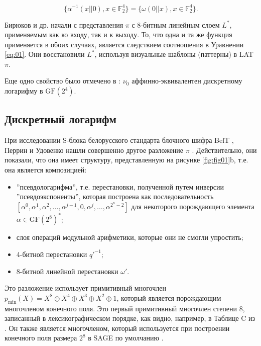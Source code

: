 \begin{equation}
\{\alpha^{-1}(x||0), x \in \mathbb{F}_2^4\} = \{\omega(0||x), x \in \mathbb{F}_2^4\}.
\label{eq:01}
\end{equation}

Бирюков и др. начали с представления \(\pi\) с 8-битным линейным слоем \(L^*\), применяемым как ко входу, так и к выходу. То, что одна и та же функция применяется в обоих случаях, является следствием соотношения в Уравнении \ref{eq:01}. Они восстановили \(L^*\), используя визуальные шаблоны (паттерны) в LAT \(\pi\).

Еще одно свойство было отмечено в \cite{PU16}: \(\nu_0\) аффинно-эквивалентен дискретному логарифму в \(\text{GF}(2^4)\).

\subsection{Дискретный логарифм}

При исследовании S-блока белорусского стандарта блочного шифра BelT \cite{Bel11}, Перрин и Удовенко нашли совершенно другое разложение \(\pi\) \cite{PU16}. Действительно, они показали, что она имеет структуру, представленную на рисунке \ref{fig:fig01}b, т.е. она является композицией:

\begin{itemize}
    \item ''псевдологарифма'', т.е. перестановки, полученной путем инверсии ''псевдоэкспоненты'', которая построена как последовательность \([\alpha^0, \alpha^1, \alpha^2, \ldots, \alpha^{j-1}, 0, \alpha^j, \ldots, \alpha^{2^n-2}]\) для некоторого порождающего элемента \(\alpha \in \text{GF}(2^8)^*\);
    \item слоя операций модульной арифметики, которые они не смогли упростить;
    \item 4-битной перестановки \(q'^{-1}\);
    \item 8-битной линейной перестановки \(\omega'\).
\end{itemize}

Это разложение использует примитивный многочлен \(p_{\text{min}}(X) = X^8 \oplus X^4 \oplus X^3 \oplus X^2 \oplus 1\), который является порождающим многочленом конечного поля. Это первый примитивный многочлен степени 8, записанный в лексикографическом порядке, как видно, например, в Таблице C из \cite{LN97}. Он также является многочленом, который используется при построении конечного поля размера \(2^8\) в SAGE по умолчанию \cite{Dev17}.

